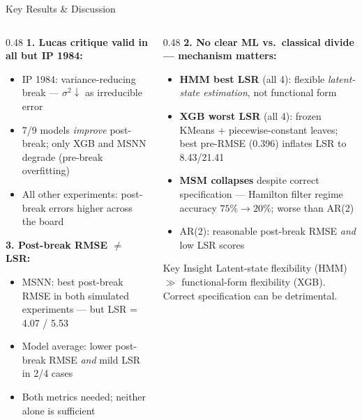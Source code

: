 \documentclass[aspectratio=169, 10pt]{beamer}
\begin{document}
\begin{frame}{Key Results \& Discussion}

  \begin{columns}[T]
    \begin{column}{0.48\textwidth}
      \textbf{1. Lucas critique valid in all but IP 1984:}
      \begin{itemize}\setlength\itemsep{3pt}
        \item IP 1984: variance-reducing break — $\sigma^2\!\downarrow$ as irreducible error
        \item 7/9 models \emph{improve} post-break; only XGB and MSNN degrade (pre-break overfitting)
        \item All other experiments: post-break errors higher across the board
      \end{itemize}

      \vspace{6pt}
      \textbf{3. Post-break RMSE $\neq$ LSR:}
      \begin{itemize}\setlength\itemsep{3pt}
        \item MSNN: best post-break RMSE in both simulated experiments — but LSR = 4.07 / 5.53
        \item Model average: lower post-break RMSE \emph{and} mild LSR in 2/4 cases
        \item Both metrics needed; neither alone is sufficient
      \end{itemize}
    \end{column}
    \begin{column}{0.48\textwidth}
      \textbf{2. No clear ML vs.\ classical divide — mechanism matters:}
      \begin{itemize}\setlength\itemsep{3pt}
        \item \textbf{HMM best LSR} (all 4): flexible \emph{latent-state estimation}, not functional form
        \item \textbf{XGB worst LSR} (all 4): frozen KMeans + piecewise-constant leaves; best pre-RMSE (0.396) inflates LSR to 8.43/21.41
        \item \textbf{MSM collapses} despite correct specification — Hamilton filter regime accuracy $75\%\to20\%$; worse than AR(2)
        \item AR(2): reasonable post-break RMSE \emph{and} low LSR scores
      \end{itemize}

      \vspace{2pt}
      \begin{block}{Key Insight}
        Latent-state flexibility (HMM) $\gg$ functional-form flexibility (XGB). \alert{Correct specification can be detrimental.}
      \end{block}
    \end{column}
  \end{columns}

\end{frame}
\end{document}
